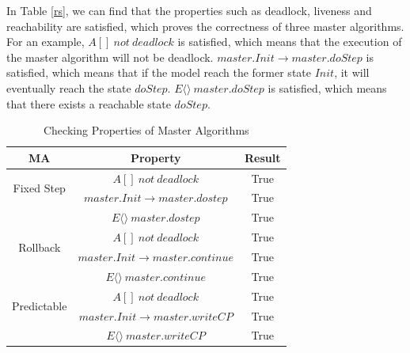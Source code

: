 In Table \ref{rs}, we can find that the properties such as deadlock, liveness and reachability are satisfied,  which proves the correctness of three master algorithms. For an example, $A[]~not~deadlock$ is satisfied, which means that the execution of the master algorithm will not be deadlock. $master.Init \rightarrow master.doStep$ is satisfied, which means that if the model reach the former state $Init$, it will eventually reach the state $doStep$. $E\langle\rangle~master.doStep$ is satisfied, which means that there exists a reachable state $doStep$. 

\begin{table}
\caption{Checking Properties of Master Algorithms}
\centering
\begin{tabular}{c c c}
        \hline
        MA & Property & Result\\
        \hline
        \multirow{2}{2.0cm}{Fixed Step}
                & $A[]~not~deadlock$ & True\\
                & $master.Init \rightarrow master.dostep$ & True\\
                & $E\langle\rangle~master.dostep$ & True\\

        \hline
        \multirow{2}{2.0cm}{Rollback}
                & $A[]~not~deadlock$ & True\\
                & $master.Init \rightarrow master.continue$ & True\\
                & $E\langle\rangle~master.continue$ & True\\

        \hline
        \multirow{2}{2.0cm}{Predictable}
                & $A[]~not~deadlock$ & True\\
                & $master.Init \rightarrow  master.writeCP$ & True\\
                & $E\langle\rangle~master.writeCP$ & True\\
        \hline
\end{tabular}
\label{ta_rs}
\end{table}

